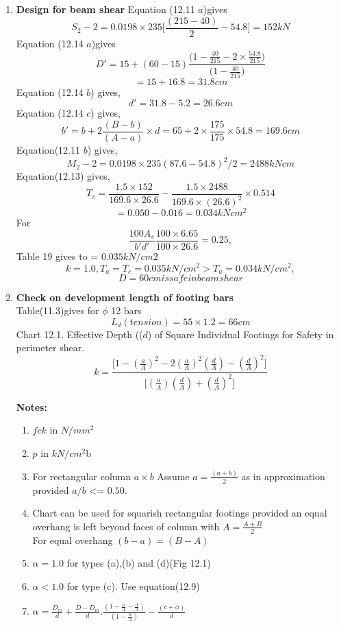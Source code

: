 \documentclass{report}
\begin{document}
\begin{enumerate}
\item  \textbf{Design for beam shear}
  Equation (12.11 $a$)gives
  $$S_2-2=0.0198\times235\Bigg[\frac{(215-40)}{2}-54.8\Bigg]=152 kN$$
  Equation (12.14 $a$)gives
  $$D'=15+(60-15)\frac{\Bigg(1-\frac{40}{215}-2\times \frac{54.8}{215}\Bigg)}{\Bigg(1-\frac{40}{215}\Bigg)}$$
  $$=15+16.8=31.8 cm$$
  Equation (12.14 $b$) gives,
  $$ d'=31.8-5.2=26.6 cm$$
  Equation (12.14 $c$) gives,
  $$b'=b+2\frac{(B-b)}{(A-a)}\times d=65+2\times \frac{175}{175}\times 54.8=169.6 cm$$
  Equation(12.11 $b$) gives,
  $$M_2-2=0.0198\times 235(87.6-54.8)^2/2=2488 kN cm$$ 
  Equation(12.13) gives,
  $$T_v=\frac{1.5\times 152}{169.6\times26.6}-\frac{1.5\times 2488}{169.6\times (26.6)^2}\times 0.514$$
  $$=0.050-0.016=0.034 kN cm^2$$
  For
  $$\frac{100A_s}{b'd'}\frac{100\times6.65}{100\times26.6}=0.25,$$
  Table 19 gives to = $0.035 kN/cm2$
  $$k=1.0, T_a=T_c=0.035 kN/cm^2>T_u=0.034 kN/cm^2,$$
$$D=60 cm is safe in beam shear$$  
  
\item  \textbf{Check on development length of footing bars}\\
Table(11.3)gives for $\phi$ 12 bars
$$L_d(tension)=55\times1.2=66cm$$
Chart 12.1. Effective Depth (($d$) of Square Individual Footings for Safety in perimeter shear.
$$k=\frac{\Bigg[1-\left(\frac{a}{A}\right)^2
-2\left(\frac{a}{A}\right)^2\left( \frac{d}{A}\right)-\left(\frac{d}{A}\right)^2\Bigg]}{\Bigg[\left(\frac{a}{A}\right)\left(\frac{d}{A}\right)+\left(\frac{d}{A}\right)^2\Bigg]}$$

\textbf{Notes:}
\begin{enumerate}
\item  $fck$ in $N/mm^2$
\item $p$ in $kN/cm^2$b
\item For rectangular column $a\times b$
Assume $a=\frac{(a+b)}{2}$ as in approximation provided $a/b$ <= $0.50.$
\item Chart can be used for squarish rectangular footings provided an equal overhang is left beyond faces of column with $A=\frac{A+B}{2}$\\
For equal overhang $(b-a)=(B-A)$
\item $\alpha=1.0$ for types (a),(b) and (d)(Fig 12.1)
\item $\alpha<1.0$ for type (c). Use equation(12.9)
\item $\alpha=\frac{D_m}{d}+\frac{D-D_m}{d}.\frac{\left(1-\frac{a}{A}-\frac{d}{A}\right)}{\left(1-\frac{a}{A}\right)}-\frac{(c+\phi)}{d}$
\end{enumerate}


\end{enumerate}
\end{document}
